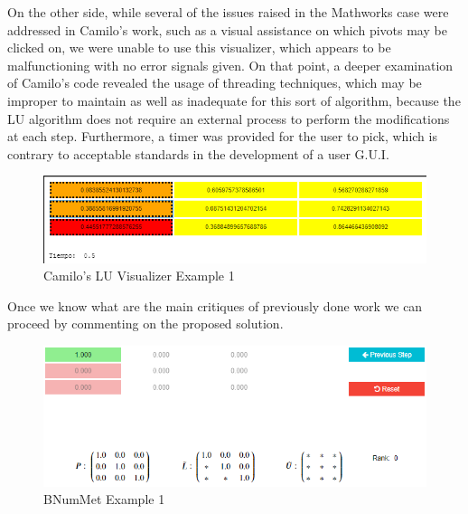 On the other side, while several of the issues raised in the Mathworks case were addressed in Camilo's work, such as a visual assistance on which pivots may be clicked on, we were unable to use this visualizer, which appears to be malfunctioning with no error signals given. On that point, a deeper examination of Camilo's code revealed the usage of threading techniques, which may be improper to maintain as well as inadequate for this sort of algorithm, because the LU algorithm does not require an external process to perform the modifications at each step. Furthermore, a timer was provided for the user to pick, which is contrary to acceptable standards in the development of a user G.U.I.

\begin{figure}[H]
    \centering
    \includegraphics[width=\textwidth]{Include/Images/Thesis/Development/Visualizers/LU VISUALIZER/Camilo.LU.Ex1.png}
    \caption{Camilo's LU Visualizer Example 1}
    \label{fig:Camilo's LU Visualizer Example 1}
\end{figure}


Once we know what are the main critiques of previously done work we can proceed by commenting on the proposed solution. 
\begin{figure}[H]
    \centering
    \includegraphics[width=\textwidth]{Include/Images/Thesis/Development/Visualizers/LU VISUALIZER/BNumMet.LU.Ex1.png}
    \caption{BNumMet Example 1}
    \label{fig:BNumMet Example}
\end{figure}

